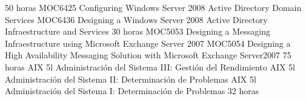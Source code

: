 \documentclass[11pt,a4paper]{moderncv}
\begin{document}
 {50 horas}{\scriptsize{
MOC6425 Configuring Windows Server 2008 Active Directory Domain Services \newline %
MOC6436 Designing a Windows Server 2008 Active Directory Infraestructure and Services}}
 {30 horas}{\scriptsize{
MOC5053 Designing a Messaging Infraestructure using Microsoft Exchange Server 2007\newline
MOC5054 Designing a High Availability Messaging Solution with Microsoft Exchange Server2007}}
 {75 horas}{\scriptsize{
AIX 5l Administraci\'on del Sistema III: Gesti\'on del Rendimiento\newline
AIX 5l Administraci\'on del Sistema II: Determinaci\'on de Problemas\newline
AIX 5l Administraci\'on del Sistema I: Determinaci\'on de Problemas}} %
 {32 horas}{}
%
%
\end{document}
